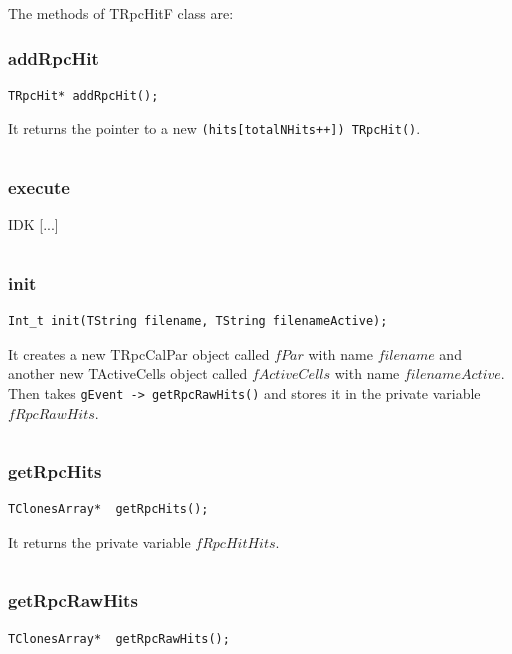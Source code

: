 \documentclass[a4paper]{book}
\begin{document}
The methods of TRpcHitF class are:

\subsubsection{addRpcHit}

\begin{lstlisting}
TRpcHit* addRpcHit();
\end{lstlisting}

It returns the pointer to a new \texttt{(hits[totalNHits++]) TRpcHit()}.

\[\]

\subsubsection{execute}

IDK [...]

\[\]

\subsubsection{init}

\begin{lstlisting}
Int_t init(TString filename, TString filenameActive);
\end{lstlisting}

It creates a new TRpcCalPar object called $fPar$ with name $filename$ and another new TActiveCells object called $fActiveCells$ with name $filenameActive$. Then takes \texttt{gEvent -> getRpcRawHits()} and stores it in the private variable $fRpcRawHits$.

\[\]

\subsubsection{getRpcHits}

\begin{lstlisting}
TClonesArray*  getRpcHits();
\end{lstlisting}

It returns the private variable $fRpcHitHits$.

\[\]

\subsubsection{getRpcRawHits}

\begin{lstlisting}
TClonesArray*  getRpcRawHits();
\end{lstlisting}
\end{document}
